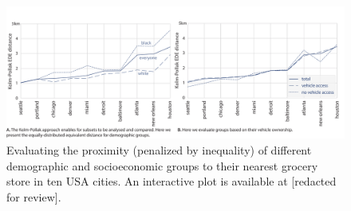 \documentclass[final,3p,times,onecolumn,sort&compress]{elsarticle}
\begin{document}
\begin{figure}
    \includegraphics[width=\linewidth]{report/fig/fig4.pdf}
    \caption{
    Evaluating the proximity (penalized by inequality) of different demographic and socioeconomic groups to their nearest grocery store in ten USA cities. 
    An interactive plot is available at [redacted for review].
    }
    \label{fig:subgroup}
\end{figure}
\end{document}

